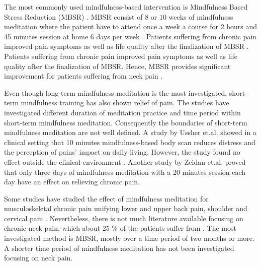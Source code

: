 
The most commonly used mindfulness-based intervention is Mindfulness Based Stress Reduction (MBSR) \cite{Cramer2012}. MBSR consist of 8 or 10 weeks of mindfulness meditation where the patient have to attend once a week a course for 2 hours and 45 minutes session at home 6 days per week \cite{Kabat1982, Chiesa2010}. Patients suffering from chronic pain improved pain symptoms as well as life quality after the finalization of MBSR \cite{Zeidan2012}.
Patients suffering from chronic pain improved pain symptoms as well as life quality after the finalization of MBSR. \cite{Zeidan2012} 
%
Hence, MBSR provides significant improvement for patients suffering from neck pain \cite{Rosenzweig2010}.

Even though long-term mindfulness meditation is the most investigated, short-term mindfulness training has also shown relief of pain. The studies have investigated different duration of meditation practice and time period within short-term mindfulness meditation. Consequently the boundaries of short-term mindfulness meditation are not well defined. A study by Ussher et.al. \cite{Ussher2012} showed in a clinical setting that 10 minutes mindfulness-based body scan reduces distress and the perception of pains’ impact on daily living. However, the study found no effect outside the clinical environment \cite{Ussher2012}. Another study by Zeidan et.al. \cite{Zeidan2012} proved that only three days of mindfulness meditation with a 20 minutes session each day have an effect on relieving chronic pain. 

Some studies have studied the effect of mindfulness meditation for musculoskeletal chronic pain unifying lower and upper back pain, shoulder and cervical pain \cite{Chiesa2010}. Nevertheless, there is not much literature available focusing on chronic neck pain, which about 25 \% of the patients suffer from \cite{Macfarlanea2016}. The most investigated method is MBSR, mostly over a time period of two months or more. A shorter time period of mindfulness meditation has not been investigated focusing on neck pain.

